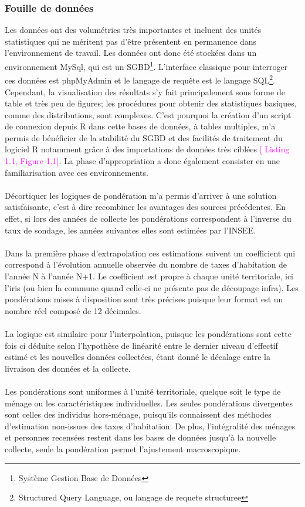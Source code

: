 \documentclass{bredele}
\begin{document}
\subsubsection{Fouille de données}
Les données ont des volumétries très importantes et incluent des unités statistiques qui ne méritent pas d'être présentent en permanence dans l'environnement de travail. Les données ont donc été stockées dans un environnement MySql, qui est un SGBD\footnote{Système Gestion Base de Données}. L'interface classique pour interroger ces données est phpMyAdmin et le langage de requête est le langage SQL\footnote{Structured Query Language, ou langage de requete structuree}. Cependant, la visualisation des résultats s'y fait principalement sous forme de table et très peu de figures; les procédures pour obtenir des statistiques basiques, comme des distributions, sont complexes. C'est pourquoi la création d'un script de connexion depuis R dans cette bases de données, à tables multiples, m'a permis de bénéficier de la stabilité du SGBD et des facilités de traitement du logiciel R notamment grâce à des importations de données très ciblées \textcolor{magenta}{[ Listing 1.1, Figure 1.1]}. La phase d'appropriation a donc également consister en une familiarisation avec ces environnements.
\\\\Décortiquer les logiques de pondération m'a permis d'arriver à une solution satisfaisante, c'est à dire recombiner les avantages des sources précédentes. En effet, si lors des années de collecte les pondérations correspondent à l'inverse du taux de sondage, les années suivantes elles sont estimées par l'INSEE.
\\\\Dans la première phase d'extrapolation ces estimations suivent un coefficient qui correspond à l'évolution annuelle observée du nombre de taxes d'habitation de l'année N à l'année N+1. Le coefficient est propre à chaque unité territoriale, ici l'iris (ou bien la commune quand celle-ci ne présente pas de découpage infra). Les pondérations mises à disposition sont très précises puisque leur format est un nombre réel composé de 12 décimales.
\\\\La logique est similaire pour l'interpolation, puisque les pondérations sont cette fois ci déduite selon l'hypothèse de linéarité entre le dernier niveau d'effectif estimé et les nouvelles données collectées, étant donné le décalage entre la livraison des données et la collecte.
\\\\Les pondérations sont uniformes à l'unité territoriale, quelque soit le type de ménage ou les caractéristiques individuelles. Les seules pondérations divergentes sont celles des individus hors-ménage, puisqu'ils connaissent des méthodes d'estimation non-issues des taxes d'habitation. De plus, l'intégralité des ménages et personnes recensées restent dans les bases de données jusqu'à la nouvelle collecte, seule la pondération permet l'ajustement macroscopique.
\end{document}

